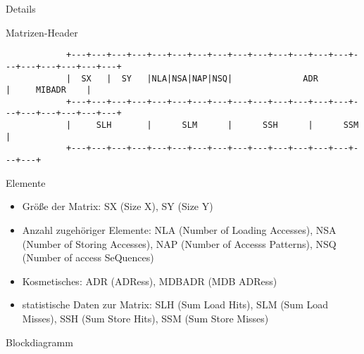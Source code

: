 \begin{frame}{Details}
	\begin{block}{Matrizen-Header}
		{\fontsize{6}{6}\selectfont
		\begin{verbatim}
			+---+---+---+---+---+---+---+---+---+---+---+---+---+---+---+---+---+---+---+---+
			|  SX   |  SY   |NLA|NSA|NAP|NSQ|              ADR              |     MIBADR    |
			+---+---+---+---+---+---+---+---+---+---+---+---+---+---+---+---+---+---+---+---+
			|     SLH       |      SLM      |      SSH      |      SSM      |
			+---+---+---+---+---+---+---+---+---+---+---+---+---+---+---+---+
		\end{verbatim}
		}
	\end{block}
	\begin{block}{Elemente}
		\begin{itemize}[<+->]
			\item Größe der Matrix: SX (Size X), SY (Size Y)
			\item Anzahl zugehöriger Elemente: NLA (Number of Loading Accesses), NSA (Number of Storing Accesses), NAP (Number of Accesss Patterns), NSQ (Number of access SeQuences)
			\item Kosmetisches: ADR (ADRess), MDBADR (MDB ADRess)
			\item statistische Daten zur Matrix: SLH (Sum Load Hits), SLM (Sum Load Misses), SSH (Sum Store Hits), SSM (Sum Store Misses)
		\end{itemize}
	\end{block}
\end{frame}


\begin{frame}{Blockdiagramm}
\end{frame}